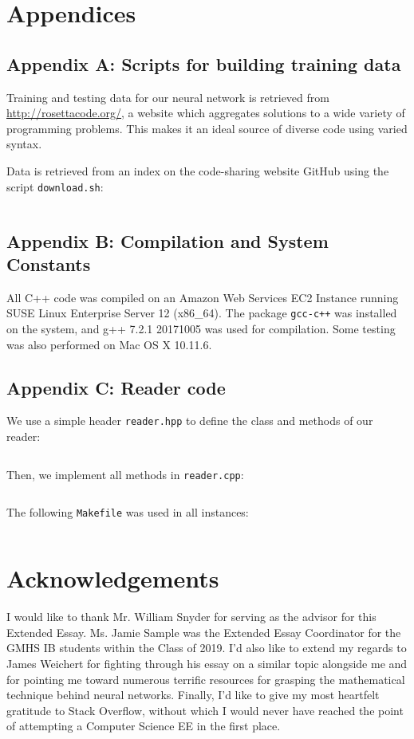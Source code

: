 \documentclass{article}
\begin{document}
\section{Appendices}

\label{sec:appendix_a}
\subsection{Appendix A: Scripts for building training data}
Training and testing data for our neural network is retrieved from \url{http://rosettacode.org/}, a website which aggregates solutions to a wide variety of programming problems. This makes it an ideal source of diverse code using varied syntax.

Data is retrieved from an index on the code-sharing website GitHub\cite{rosettacodegh} using the script \texttt{download.sh}:
\inputminted{bash}{code/data/download.sh}

\label{sec:appendix_b}
\subsection{Appendix B: Compilation and System Constants}
All C++ code was compiled on an Amazon Web Services EC2 Instance running SUSE Linux Enterprise Server 12 (x86\_64). The package \texttt{gcc-c++} was installed on the system, and g++ 7.2.1 20171005 was used for compilation. Some testing was also performed on Mac OS X 10.11.6.

\label{sec:appendix_c}
\subsection{Appendix C: Reader code}
We use a simple header \texttt{reader.hpp} to define the class and methods of our reader:
\inputminted{cpp}{code/reader.hpp}
Then, we implement all methods in \texttt{reader.cpp}:
\inputminted{cpp}{code/reader.cpp}

The following \texttt{Makefile} was used in all instances:
\inputminted{makefile}{code/Makefile}

\section{Acknowledgements}
I would like to thank Mr. William Snyder for serving as the advisor for this Extended Essay. Ms. Jamie Sample was the Extended Essay Coordinator for the GMHS IB students within the Class of 2019. I'd also like to extend my regards to James Weichert for fighting through his essay on a similar topic alongside me and for pointing me toward numerous terrific resources for grasping the mathematical technique behind neural networks. Finally, I'd like to give my most heartfelt gratitude to Stack Overflow, without which I would never have reached the point of attempting a Computer Science EE in the first place.


\end{document}
